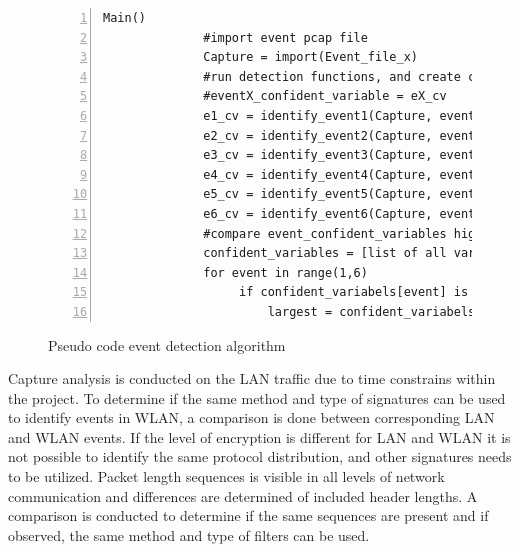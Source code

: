 \begin{figure}[H]
    \centering
    \caption{Pseudo code event detection algorithm}
    \label{fig:Sudo_code_event_detection_alg}
    \begin{lstlisting}[numbers=left]
         Main()
              #import event pcap file
              Capture = import(Event_file_x)
              #run detection functions, and create confidence variables
              #eventX_confident_variable = eX_cv  
              e1_cv = identify_event1(Capture, event1_confidence_variable)
              e2_cv = identify_event2(Capture, event1_confidence_variable)
              e3_cv = identify_event3(Capture, event1_confidence_variable)
              e4_cv = identify_event4(Capture, event1_confidence_variable)
              e5_cv = identify_event5(Capture, event1_confidence_variable)
              e6_cv = identify_event6(Capture, event1_confidence_variable)
              #compare event_confident_variables highest is event
              confident_variables = [list of all variables]
              for event in range(1,6)
                   if confident_variabels[event] is larger than last number
                       largest = confident_variabels[event]  
    \end{lstlisting}
\end{figure}

Capture analysis is conducted on the LAN traffic due to time constrains within the project. To determine if the same method and type of signatures can be used to identify events in WLAN, a comparison is done between corresponding LAN and WLAN events. If the level of encryption is different for LAN and WLAN it is not possible to identify the same protocol distribution, and other signatures needs to be utilized. Packet length sequences is visible in all levels of network communication and differences are determined of included header lengths. A comparison is conducted to determine if the same sequences are present and if observed, the same method and type of filters can be used. 

